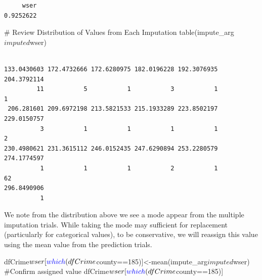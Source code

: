 \documentclass[]{article}
\newenvironment{Shaded}{}{}
\newcommand{\CommentTok}[1]{\textcolor[rgb]{0.00,0.50,0.00}{#1}}
\newcommand{\DecValTok}[1]{#1}
\newcommand{\KeywordTok}[1]{\textcolor[rgb]{0.00,0.00,1.00}{#1}}
\newcommand{\NormalTok}[1]{#1}
\newcommand{\OperatorTok}[1]{#1}
\begin{document}
\begin{Shaded}
\end{Shaded}

\begin{verbatim}
     wser 
0.9252622 
\end{verbatim}

\begin{Shaded}
\begin{Highlighting}[]
\CommentTok{# Review Distribution of Values from Each Imputation}
\KeywordTok{table}\NormalTok{(impute_arg}\OperatorTok{$}\NormalTok{imputed}\OperatorTok{$}\NormalTok{wser)}
\end{Highlighting}
\end{Shaded}

\begin{verbatim}

133.0430603 172.4732666 172.6280975 182.0196228 192.3076935 204.3792114 
         11           5           1           3           1           1 
 206.281601 209.6972198 213.5821533 215.1933289 223.8502197 229.0150757 
          3           1           1           1           1           2 
230.4980621 231.3615112 246.0152435 247.6290894 253.2280579 274.1774597 
          1           1           1           2           1          62 
296.8490906 
          1 
\end{verbatim}

We note from the distribution above we see a mode appear from the
multiple imputation trials. While taking the mode may sufficient for
replacement (particularly for categorical values), to be conservative,
we will reassign this value using the mean value from the prediction
trials.

\begin{Shaded}
\begin{Highlighting}[]
\NormalTok{dfCrime}\OperatorTok{$}\NormalTok{wser[}\KeywordTok{which}\NormalTok{(dfCrime}\OperatorTok{$}\NormalTok{county}\OperatorTok{==}\DecValTok{185}\NormalTok{)]<-}\KeywordTok{mean}\NormalTok{(impute_arg}\OperatorTok{$}\NormalTok{imputed}\OperatorTok{$}\NormalTok{wser)}
\CommentTok{#Confirm assigned value}
\NormalTok{dfCrime}\OperatorTok{$}\NormalTok{wser[}\KeywordTok{which}\NormalTok{(dfCrime}\OperatorTok{$}\NormalTok{county}\OperatorTok{==}\DecValTok{185}\NormalTok{)]}
\end{Highlighting}
\end{Shaded}
\end{document}

